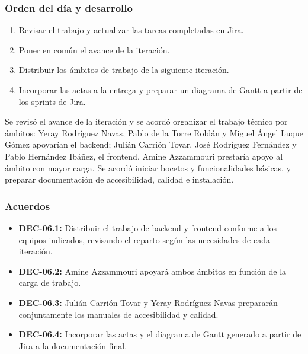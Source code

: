 \subsubsection{Orden del día y desarrollo}
\begin{enumerate}[leftmargin=*]
  \item Revisar el trabajo y actualizar las tareas completadas en Jira.
  \item Poner en común el avance de la iteración.
  \item Distribuir los ámbitos de trabajo de la siguiente iteración.
  \item Incorporar las actas a la entrega y preparar un diagrama de Gantt a partir de los sprints de Jira.
\end{enumerate}
Se revisó el avance de la iteración y se acordó organizar el trabajo técnico por ámbitos: Yeray Rodríguez Navas, Pablo de la Torre Roldán y Miguel Ángel Luque Gómez apoyarían el backend; Julián Carrión Tovar, José Rodríguez Fernández y Pablo Hernández Ibáñez, el frontend. Amine Azzammouri prestaría apoyo al ámbito con mayor carga. Se acordó iniciar bocetos y funcionalidades básicas, y preparar documentación de accesibilidad, calidad e instalación.

\subsubsection{Acuerdos}
\begin{itemize}[leftmargin=*]
  \item \textbf{DEC-06.1:} Distribuir el trabajo de backend y frontend conforme a los equipos indicados, revisando el reparto según las necesidades de cada iteración.
  \item \textbf{DEC-06.2:} Amine Azzammouri apoyará ambos ámbitos en función de la carga de trabajo.
  \item \textbf{DEC-06.3:} Julián Carrión Tovar y Yeray Rodríguez Navas prepararán conjuntamente los manuales de accesibilidad y calidad.
  \item \textbf{DEC-06.4:} Incorporar las actas y el diagrama de Gantt generado a partir de Jira a la documentación final.
\end{itemize}

